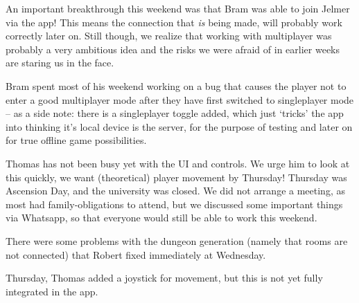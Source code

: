 \documentclass[../main.tex]{subfiles}
\begin{document}
An important breakthrough this weekend was that Bram was able to join Jelmer via the app! This means the connection that \textit{is} being made, will probably work correctly later on. Still though, we realize that working with multiplayer was probably a very ambitious idea and the risks we were afraid of in earlier weeks are staring us in the face.

Bram spent most of his weekend working on a bug that causes the player not to enter a good multiplayer mode after they have first switched to singleplayer mode -- as a side note: there is a singleplayer toggle added, which just `tricks' the app into thinking it's local device is the server, for the purpose of testing and later on for true offline game possibilities.

Thomas has not been busy yet with the UI and controls. We urge him to look at this quickly, we want (theoretical) player movement by Thursday!
\bigbreak\noindent
Thursday was Ascension Day, and the university was closed. We did not arrange a meeting, as most had family-obligations to attend, but we discussed some important things via Whatsapp, so that everyone would still be able to work this weekend.

There were some problems with the dungeon generation (namely that rooms are not connected) that Robert fixed immediately at Wednesday.

Thursday, Thomas added a joystick for movement, but this is not yet fully integrated in the app.
\end{document}
